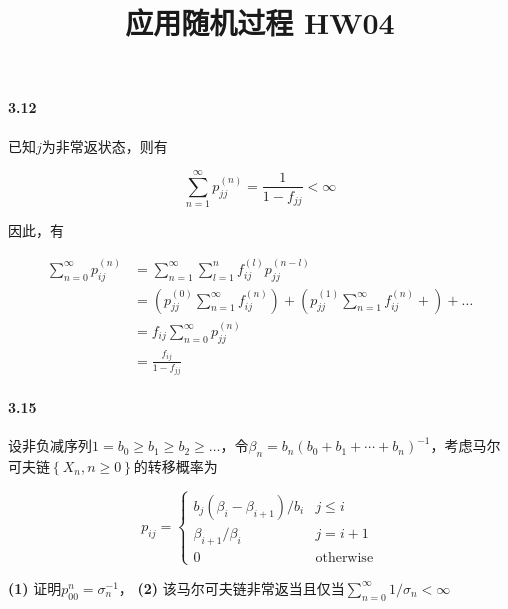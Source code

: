\documentclass{../notes}
\title{应用随机过程 HW04}
\begin{document}
\maketitle

\paragraph*{3.12} 已知$j$为非常返状态，则有

\begin{equation}
    \sum_{n=1}^\infty p_{jj}^{(n)} = \frac{1}{1-f_{jj}} < \infty
\end{equation}

因此，有

\begin{equation}
    \begin{aligned}
        \sum_{n=0}^\infty p_{ij}^{(n)}
         & = \sum_{n=1}^\infty \sum_{l=1}^n f_{ij}^{(l)}p_{jj}^{(n-l)}                                                                     \\
         & = \left(p_{jj}^{(0)}\sum_{n=1}^\infty f_{ij}^{(n)}\right) +  \left(p_{jj}^{(1)}\sum_{n=1}^\infty f_{ij}^{(n)} + \right) + \dots \\
         & =  f_{ij}\sum_{n=0}^\infty p_{jj}^{(n)}                                                                                         \\
         & = \frac{f_{ij}}{1-f_{jj}}
    \end{aligned}
\end{equation}

\paragraph*{3.15} 设非负减序列$1=b_0\geq b_1\geq b_2 \geq \dots$，令$\beta_n = b_n\left(b_0+b_1+\cdots + b_n\right)^{-1}$，考虑马尔可夫链$\left\{X_n, n\geq 0\right\}$的转移概率为

\begin{equation*}
    p_{ij}=\begin{cases}
        b_j\left(\beta_i - \beta_{i+1}\right)/b_i & j\leq i          \\
        \beta_{i+1} / \beta_{i}                   & j = i + 1        \\
        0                                         & \text{otherwise}
    \end{cases}
\end{equation*}

\textbf{(1)} 证明$p_{00}^n = \sigma_n^{-1}$， \textbf{(2)} 该马尔可夫链非常返当且仅当$\sum_{n=0}^\infty 1/\sigma_{n} < \infty$
\end{document}
